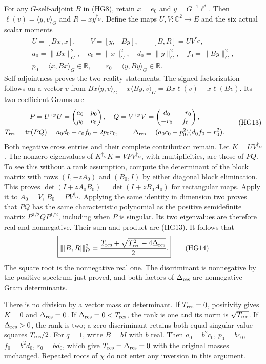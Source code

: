 \documentclass{article}
\begin{document}
For any $G$-self-adjoint $B$ in (HG8), retain $x=e_0$ and
$y=G^{-1}\ell^*$. Then $\ell(v)=\langle y,v\rangle_G$ and
$R=xy^{\dagger_G}$. Define the maps $U,V:\mathbb C^2\to E$ and
the six actual scalar moments
\[
\begin{gathered}
 U=[Bx,x],\qquad V=[y,-By],\qquad [B,R]=UV^{\dagger_G},\\
 a_0=\|Bx\|_G^2,\quad c_0=\|x\|_G^2,\quad
 d_0=\|y\|_G^2,\quad f_0=\|By\|_G^2,\\
 p_0=\langle x,Bx\rangle_G\in\mathbb R,\qquad
 r_0=\langle y,By\rangle_G\in\mathbb R .
\end{gathered}\tag{HG12}
\]
Self-adjointness proves the two reality statements. The signed
factorization follows on a vector $v$ from
$Bx\langle y,v\rangle_G-x\langle By,v\rangle_G
=Bx\ell(v)-x\ell(Bv)$. Its two coefficient Grams are
\[
\begin{gathered}
 P=U^{\dagger_G}U=\begin{pmatrix}a_0&p_0\\p_0&c_0\end{pmatrix},
 \quad Q=V^{\dagger_G}V=\begin{pmatrix}d_0&-r_0\\-r_0&f_0\end{pmatrix},\\
 T_{\rm res}=\operatorname{tr}(PQ)=a_0d_0+c_0f_0-2p_0r_0,\qquad
 \Delta_{\rm res}=(a_0c_0-p_0^2)(d_0f_0-r_0^2).
\end{gathered}\tag{HG13}
\]
Both negative cross entries and their complete contribution remain.
Let $K=UV^{\dagger_G}$. The nonzero eigenvalues of
$K^{\dagger_G}K=VPV^{\dagger_G}$, with multiplicities, are those
of $PQ$. To see this without a rank assumption, compute the determinant
of the block matrix with rows $(I,-zA_0)$ and $(B_0,I)$ by either
diagonal block elimination. This proves
$\det(I+zA_0B_0)=\det(I+zB_0A_0)$ for rectangular maps. Apply it to
$A_0=V$, $B_0=PV^{\dagger_G}$.
Applying the same identity in dimension two proves that $PQ$ has the
same characteristic polynomial as the positive semidefinite matrix
$P^{1/2}QP^{1/2}$, including when $P$ is singular. Its two eigenvalues
are therefore real and nonnegative. Their sum and product are (HG13).
It follows that
\[
 \boxed{\|[B,R]\|_G^2=
 \frac{T_{\rm res}+\sqrt{T_{\rm res}^2-4\Delta_{\rm res}}}{2}.}
 \tag{HG14}
\]
The square root is the nonnegative real one. The discriminant is
nonnegative by the positive spectrum just proved, and both factors of
$\Delta_{\rm res}$ are nonnegative Gram determinants.

There is no division by a vector mass or determinant. If
$T_{\rm res}=0$, positivity gives $K=0$ and $\Delta_{\rm res}=0$.
If $\Delta_{\rm res}=0<T_{\rm res}$, the rank is one and its norm
is $\sqrt{T_{\rm res}}$. If $\Delta_{\rm res}>0$, the rank is two;
a zero discriminant retains both equal singular-value squares
$T_{\rm res}/2$. For $q=1$, write $B=bI$ with $b$ real. Then
$a_0=b^2c_0$, $p_0=bc_0$, $f_0=b^2d_0$, $r_0=bd_0$, which give
$T_{\rm res}=\Delta_{\rm res}=0$ with the original masses unchanged.
Repeated roots of $\chi$ do not enter any inversion in this argument.
\end{document}

